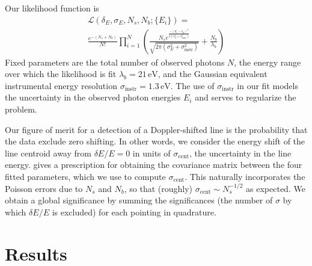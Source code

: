 \documentclass[aps,prd,10pt,twocolumn,superscriptaddress,showpacs]{revtex4-1}
\newcommand{\units}[1]{\,\mathrm{#1}}
\begin{document}
Our likelihood function is
\begin{multline}
	\mathcal{L}(\delta_E, \sigma_E, N_s, N_b; \{E_i\}) =\\
	\frac{e^{-(N_s+N_b)}}{N!} \prod_{i=1}^{N}
	\left(\frac{N_s e^{\frac{-(E_i-\delta_E)^2}{2(\sigma_E^2+\sigma_\mathrm{instr}^2)}}}
	{\sqrt{2\pi(\sigma_E^2+\sigma_\mathrm{instr}^2)}}+\frac{N_b}{\lambda_b}\right)
\end{multline}
Fixed parameters are the total number
of observed photons $N$, the energy range over which the likelihood is fit $\lambda_b=21 \units{eV}$, 
and the Gaussian equivalent instrumental energy resolution $\sigma_\mathrm{instr}=1.3 \units{eV}$. The use of $\sigma_\mathrm{instr}$
in our fit models the uncertainty in the observed photon energies $E_i$ and serves to regularize the problem.



Our figure of merit for a detection of a Doppler-shifted line is the probability that the data
exclude zero shifting. In other words, we consider the energy shift of the line centroid
away from $\delta E/E=0$ in units of $\sigma_\mathrm{cent}$, the uncertainty in the line energy.
\cite{barlow1990} gives a prescription for obtaining the covariance matrix between the four fitted
parameters, which we use to compute $\sigma_\mathrm{cent}$. This naturally incorporates the Poisson errors due to
$N_s$ and $N_b$, so that (roughly) $\sigma_\mathrm{cent} \sim N_s^{-1/2}$ as expected. 
We obtain a global significance by summing the significances (the
number of $\sigma$ by which $\delta E/E$ is excluded) for each
pointing in quadrature.


\section{Results}
\label{sec:results}
\end{document}

